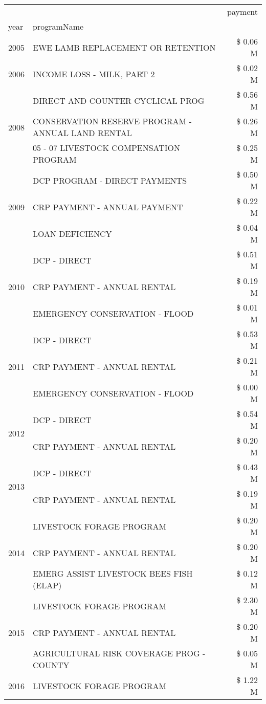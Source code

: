 \begin{tabular}{llr}
\toprule
 &  & payment \\
year & programName &  \\
\midrule
2005 & EWE LAMB REPLACEMENT OR RETENTION & \$ 0.06 M \\
\cline{1-3}
2006 & INCOME LOSS - MILK, PART 2 & \$ 0.02 M \\
\cline{1-3}
\multirow[t]{3}{*}{2008} & DIRECT AND COUNTER CYCLICAL PROG & \$ 0.56 M \\
 & CONSERVATION RESERVE PROGRAM - ANNUAL LAND RENTAL & \$ 0.26 M \\
 & 05 - 07 LIVESTOCK COMPENSATION PROGRAM & \$ 0.25 M \\
\cline{1-3}
\multirow[t]{3}{*}{2009} & DCP PROGRAM - DIRECT PAYMENTS & \$ 0.50 M \\
 & CRP PAYMENT - ANNUAL PAYMENT & \$ 0.22 M \\
 & LOAN DEFICIENCY & \$ 0.04 M \\
\cline{1-3}
\multirow[t]{3}{*}{2010} & DCP - DIRECT & \$ 0.51 M \\
 & CRP PAYMENT - ANNUAL RENTAL & \$ 0.19 M \\
 & EMERGENCY CONSERVATION - FLOOD & \$ 0.01 M \\
\cline{1-3}
\multirow[t]{3}{*}{2011} & DCP - DIRECT & \$ 0.53 M \\
 & CRP PAYMENT - ANNUAL RENTAL & \$ 0.21 M \\
 & EMERGENCY CONSERVATION - FLOOD & \$ 0.00 M \\
\cline{1-3}
\multirow[t]{2}{*}{2012} & DCP - DIRECT & \$ 0.54 M \\
 & CRP PAYMENT - ANNUAL RENTAL & \$ 0.20 M \\
\cline{1-3}
\multirow[t]{2}{*}{2013} & DCP - DIRECT & \$ 0.43 M \\
 & CRP PAYMENT - ANNUAL RENTAL & \$ 0.19 M \\
\cline{1-3}
\multirow[t]{3}{*}{2014} & LIVESTOCK FORAGE PROGRAM & \$ 0.20 M \\
 & CRP PAYMENT - ANNUAL RENTAL & \$ 0.20 M \\
 & EMERG ASSIST LIVESTOCK BEES FISH (ELAP) & \$ 0.12 M \\
\cline{1-3}
\multirow[t]{3}{*}{2015} & LIVESTOCK FORAGE PROGRAM & \$ 2.30 M \\
 & CRP PAYMENT - ANNUAL RENTAL & \$ 0.20 M \\
 & AGRICULTURAL RISK COVERAGE PROG - COUNTY & \$ 0.05 M \\
\cline{1-3}
\multirow[t]{3}{*}{2016} & LIVESTOCK FORAGE PROGRAM & \$ 1.22 M \\

\end{tabular}

